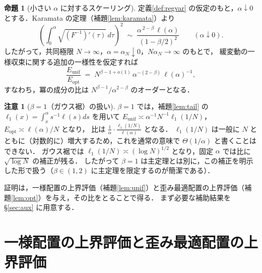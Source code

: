\documentclass[a4paper,10pt]{jsarticle}
\theoremstyle{definition}
\newtheorem{proposition}{命題}[section]
\newtheorem{remark}{注意}[section]
\newcommand{\Finv}{F^{-1}}
\begin{document}
\begin{proposition}[小さい $\alpha$ に対するスケーリング]
定義\ref{def:regvar} の仮定のもと，$\alpha\downarrow0$ とする．Karamata の定理（補題\ref{lem:karamata}）より
\begin{equation}
  \left(\int_0^\alpha\sqrt{(\Finv)'(\tau)}\,d\tau\right)^{2}
  \;\sim\;\frac{\alpha^{\,2-\beta}\,\ell(\alpha)}{(1-\beta/2)^{2}}
  \qquad(\alpha\downarrow0).
  \label{eq:alpha-scaling}
\end{equation}
したがって，共同極限 $N\to\infty$，$\alpha=\alpha_N\downarrow0$，$N\alpha_N\to\infty$ のもとで，
緩変動の一様収束に関する追加の一様性を仮定すれば
\begin{equation}
  \frac{E_{\mathrm{unif}}}{E_{\mathrm{opt}}}
  \;=\;N^{\beta-1+o(1)}\,\alpha^{-(2-\beta)}\,\ell(\alpha)^{-1},
  \label{eq:conj-scaling2}
\end{equation}
すなわち，冪の成分の比は $N^{\beta-1}/\alpha^{2-\beta}$ のオーダーとなる．
\end{proposition}

\begin{remark}[$\beta=1$（ガウス裾）の扱い]
\label{rem:beta1}
$\beta=1$ では，補題\ref{lem:tail} の $\ell_1(x)=\int_x^\alpha s^{-1}\ell(s)ds$ を用いて
$E_{\mathrm{unif}}\asymp\alpha^{-1}N^{-1}\ell_1(1/N)$，$E_{\mathrm{opt}}\asymp\ell(\alpha)/N$ となり，
比は $\frac1\alpha\cdot\frac{\ell_1(1/N)}{\ell(\alpha)}$ となる．
$\ell_1(1/N)$ は一般に $N$ とともに（対数的に）増大するため，これを通常の意味で $\Theta(1/\alpha)$ と書くことはできない．
ガウス裾では $\ell_1(1/N)\asymp(\log N)^{1/2}$ となり，固定 $\alpha$ では比に $\sqrt{\log N}$ の補正が残る．
したがって $\beta=1$ は主定理とは別に，この補正を明示した形で扱う（$\beta\in(1,2)$ に主定理を限定するのが簡潔である）．
\end{remark}

証明は，一様配置の上界評価（補題\ref{lem:unif}）と歪み最適配置の上界評価（補題\ref{lem:opt}）を与え，その比をとることで得る．
まず必要な補助結果を §\ref{sec:aux} に用意する．

\section{一様配置の上界評価と歪み最適配置の上界評価}
\end{document}
